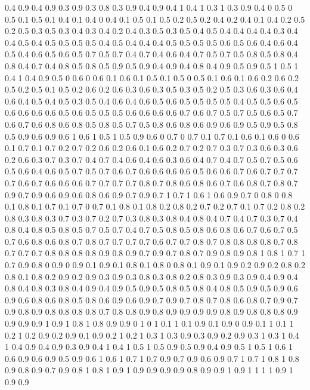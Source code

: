 0.4 0.9
0.4 0.9
0.3 0.9
0.3 0.8
0.3 0.9
0.4 0.9
0.4 1
0.4 1
0.3 1
0.3 0.9
0.4 0
0.5 0
0.5 0.1
0.5 0.1
0.4 0.1
0.4 0
0.4 0.1
0.5 0.1
0.5 0.2
0.5 0.2
0.4 0.2
0.4 0.1
0.4 0.2
0.5 0.2
0.5 0.3
0.5 0.3
0.4 0.3
0.4 0.2
0.4 0.3
0.5 0.3
0.5 0.4
0.5 0.4
0.4 0.4
0.4 0.3
0.4 0.4
0.5 0.4
0.5 0.5
0.5 0.5
0.4 0.5
0.4 0.4
0.4 0.5
0.5 0.5
0.5 0.6
0.5 0.6
0.4 0.6
0.4 0.5
0.4 0.6
0.5 0.6
0.5 0.7
0.5 0.7
0.4 0.7
0.4 0.6
0.4 0.7
0.5 0.7
0.5 0.8
0.5 0.8
0.4 0.8
0.4 0.7
0.4 0.8
0.5 0.8
0.5 0.9
0.5 0.9
0.4 0.9
0.4 0.8
0.4 0.9
0.5 0.9
0.5 1
0.5 1
0.4 1
0.4 0.9
0.5 0
0.6 0
0.6 0.1
0.6 0.1
0.5 0.1
0.5 0
0.5 0.1
0.6 0.1
0.6 0.2
0.6 0.2
0.5 0.2
0.5 0.1
0.5 0.2
0.6 0.2
0.6 0.3
0.6 0.3
0.5 0.3
0.5 0.2
0.5 0.3
0.6 0.3
0.6 0.4
0.6 0.4
0.5 0.4
0.5 0.3
0.5 0.4
0.6 0.4
0.6 0.5
0.6 0.5
0.5 0.5
0.5 0.4
0.5 0.5
0.6 0.5
0.6 0.6
0.6 0.6
0.5 0.6
0.5 0.5
0.5 0.6
0.6 0.6
0.6 0.7
0.6 0.7
0.5 0.7
0.5 0.6
0.5 0.7
0.6 0.7
0.6 0.8
0.6 0.8
0.5 0.8
0.5 0.7
0.5 0.8
0.6 0.8
0.6 0.9
0.6 0.9
0.5 0.9
0.5 0.8
0.5 0.9
0.6 0.9
0.6 1
0.6 1
0.5 1
0.5 0.9
0.6 0
0.7 0
0.7 0.1
0.7 0.1
0.6 0.1
0.6 0
0.6 0.1
0.7 0.1
0.7 0.2
0.7 0.2
0.6 0.2
0.6 0.1
0.6 0.2
0.7 0.2
0.7 0.3
0.7 0.3
0.6 0.3
0.6 0.2
0.6 0.3
0.7 0.3
0.7 0.4
0.7 0.4
0.6 0.4
0.6 0.3
0.6 0.4
0.7 0.4
0.7 0.5
0.7 0.5
0.6 0.5
0.6 0.4
0.6 0.5
0.7 0.5
0.7 0.6
0.7 0.6
0.6 0.6
0.6 0.5
0.6 0.6
0.7 0.6
0.7 0.7
0.7 0.7
0.6 0.7
0.6 0.6
0.6 0.7
0.7 0.7
0.7 0.8
0.7 0.8
0.6 0.8
0.6 0.7
0.6 0.8
0.7 0.8
0.7 0.9
0.7 0.9
0.6 0.9
0.6 0.8
0.6 0.9
0.7 0.9
0.7 1
0.7 1
0.6 1
0.6 0.9
0.7 0
0.8 0
0.8 0.1
0.8 0.1
0.7 0.1
0.7 0
0.7 0.1
0.8 0.1
0.8 0.2
0.8 0.2
0.7 0.2
0.7 0.1
0.7 0.2
0.8 0.2
0.8 0.3
0.8 0.3
0.7 0.3
0.7 0.2
0.7 0.3
0.8 0.3
0.8 0.4
0.8 0.4
0.7 0.4
0.7 0.3
0.7 0.4
0.8 0.4
0.8 0.5
0.8 0.5
0.7 0.5
0.7 0.4
0.7 0.5
0.8 0.5
0.8 0.6
0.8 0.6
0.7 0.6
0.7 0.5
0.7 0.6
0.8 0.6
0.8 0.7
0.8 0.7
0.7 0.7
0.7 0.6
0.7 0.7
0.8 0.7
0.8 0.8
0.8 0.8
0.7 0.8
0.7 0.7
0.7 0.8
0.8 0.8
0.8 0.9
0.8 0.9
0.7 0.9
0.7 0.8
0.7 0.9
0.8 0.9
0.8 1
0.8 1
0.7 1
0.7 0.9
0.8 0
0.9 0
0.9 0.1
0.9 0.1
0.8 0.1
0.8 0
0.8 0.1
0.9 0.1
0.9 0.2
0.9 0.2
0.8 0.2
0.8 0.1
0.8 0.2
0.9 0.2
0.9 0.3
0.9 0.3
0.8 0.3
0.8 0.2
0.8 0.3
0.9 0.3
0.9 0.4
0.9 0.4
0.8 0.4
0.8 0.3
0.8 0.4
0.9 0.4
0.9 0.5
0.9 0.5
0.8 0.5
0.8 0.4
0.8 0.5
0.9 0.5
0.9 0.6
0.9 0.6
0.8 0.6
0.8 0.5
0.8 0.6
0.9 0.6
0.9 0.7
0.9 0.7
0.8 0.7
0.8 0.6
0.8 0.7
0.9 0.7
0.9 0.8
0.9 0.8
0.8 0.8
0.8 0.7
0.8 0.8
0.9 0.8
0.9 0.9
0.9 0.9
0.8 0.9
0.8 0.8
0.8 0.9
0.9 0.9
0.9 1
0.9 1
0.8 1
0.8 0.9
0.9 0
1 0
1 0.1
1 0.1
0.9 0.1
0.9 0
0.9 0.1
1 0.1
1 0.2
1 0.2
0.9 0.2
0.9 0.1
0.9 0.2
1 0.2
1 0.3
1 0.3
0.9 0.3
0.9 0.2
0.9 0.3
1 0.3
1 0.4
1 0.4
0.9 0.4
0.9 0.3
0.9 0.4
1 0.4
1 0.5
1 0.5
0.9 0.5
0.9 0.4
0.9 0.5
1 0.5
1 0.6
1 0.6
0.9 0.6
0.9 0.5
0.9 0.6
1 0.6
1 0.7
1 0.7
0.9 0.7
0.9 0.6
0.9 0.7
1 0.7
1 0.8
1 0.8
0.9 0.8
0.9 0.7
0.9 0.8
1 0.8
1 0.9
1 0.9
0.9 0.9
0.9 0.8
0.9 0.9
1 0.9
1 1
1 1
0.9 1
0.9 0.9
